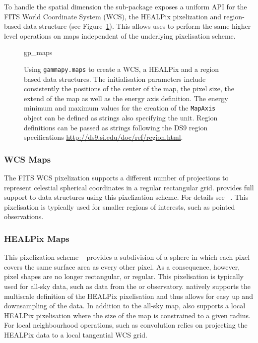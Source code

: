 \documentclass[traditabstract, longauth]{aa}
\newcommand{\code}[1]{\texttt{#1}}
\begin{document}
{To handle the spatial dimension the sub-package exposes a uniform API for
the FITS World Coordinate System (WCS), the HEALPix pixelization and
region-based data structure (see Figure~\ref{ig*:minted:gp_maps}).
This allows uses to perform the same higher level operations on maps
independent of the underlying pixelisation scheme.

\begin{figure}
	\small
	{gp_maps}

	\caption{
        Using \code{gammapy.maps} to create a WCS, a HEALPix and a region
		based data structures. The initialisation parameters include
        consistently the positions of the center of the map, the pixel
        size, the extend of the map as well as the energy axis definition.
        The energy minimum and maximum values for the creation of the
        \code{MapAxis} object can be defined as strings also specifying the
        unit. Region definitions can be passed as strings following
        the DS9 region specifications \url{http://ds9.si.edu/doc/ref/region.html}.
        }
    \label{ig*:minted:gp_maps}
\end{figure}

\subsubsection{WCS Maps}
The FITS WCS pixelization supports a different number of projections to
represent celestial spherical coordinates in a regular rectangular grid.
\gammapy provides full support to data structures using this pixelization
scheme. For details see ~\cite{Calabretta2002}. This pixelisation
is typically used for smaller regions of interests, such as pointed
observations.


\subsubsection{HEALPix Maps}
This pixelization scheme ~\citep{Calabretta2002} provides a
subdivision of a sphere in which each pixel covers the same surface area as
every other pixel. As a consequence, however, pixel shapes are no longer
rectangular, or regular.
This pixelisation is typically used for all-sky data, such as data
from the \hawc or \fermi observatory. \gammapy natively supports
the multiscale definition of the HEALPix pixelisation and thus
allows for easy up and downsampling of the data. In addition to
the all-sky map, \gammapy also supports a local HEALPix
pixelisation where the size of the map is constrained to a given
radius.
For local neighbourhood operations, such as convolution \gammapy relies
on projecting the HEALPix data to a local tangential WCS grid.

}
\end{document}
